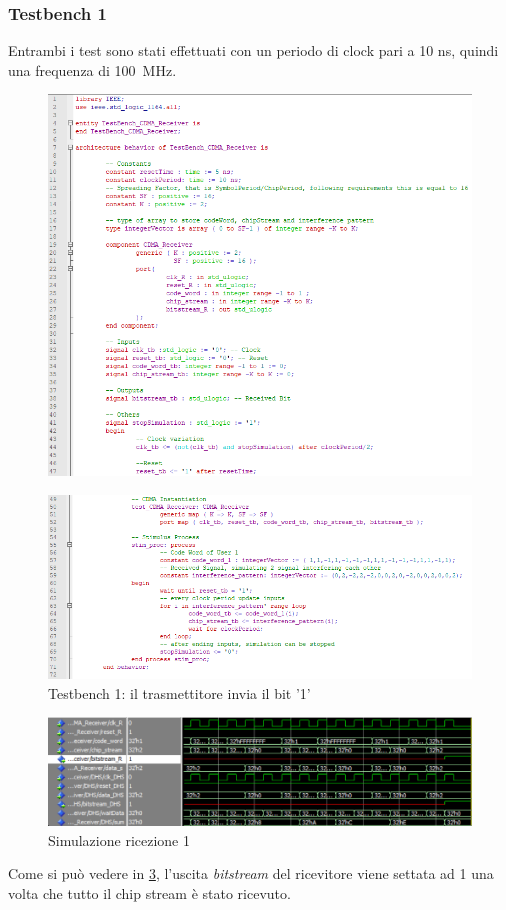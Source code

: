 \documentclass[a4paper,12pt]{article}
\begin{document}
    \subsubsection{Testbench 1}
    Entrambi i test sono stati effettuati con un periodo di clock pari a 10 ns, quindi una frequenza di \SI{100}{\mega\hertz}.
    \begin{figure}[H]
      \centering
      \includegraphics[scale=0.9]{img/TB1.png}
      \label{fig:vhdl:tb1}
    \end{figure}
    \begin{figure}[H]
      \centering
      \includegraphics[width=\textwidth]{img/TB1.1.png}
      \caption{Testbench 1: il trasmettitore invia il bit '1'}
      \label{fig:vhdl:tb11}
    \end{figure}

    \begin{figure}[H]
      \centering
      \includegraphics[width=\textwidth]{img/Wave1.png}
      \caption{Simulazione ricezione 1}
      \label{fig:vhdl:wave1}
    \end{figure}
    Come si può vedere in \ref{fig:vhdl:wave1}, l'uscita \textit{bitstream} del ricevitore viene settata ad 1 una volta 
    che tutto il chip stream è stato ricevuto.
\end{document}
